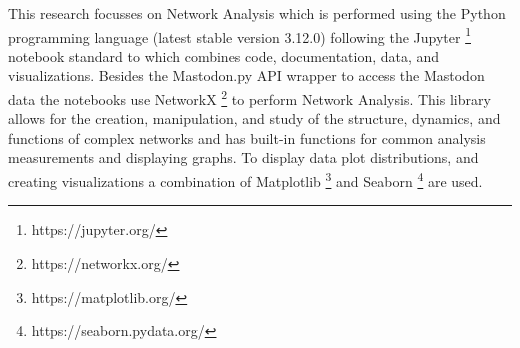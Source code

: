 This research focusses on Network Analysis which is performed using the Python programming language (latest stable version 3.12.0) following the Jupyter \footnote{https://jupyter.org/} notebook standard to which combines code, documentation, data, and visualizations. Besides the Mastodon.py API wrapper to access the Mastodon data the notebooks use NetworkX \footnote{https://networkx.org/} to perform Network Analysis. This library allows for the creation, manipulation, and study of the structure, dynamics, and functions of complex networks and has built-in functions for common analysis measurements and displaying graphs. To display data  plot distributions, and creating visualizations a combination of Matplotlib \footnote{https://matplotlib.org/} and Seaborn \footnote{https://seaborn.pydata.org/} are used.